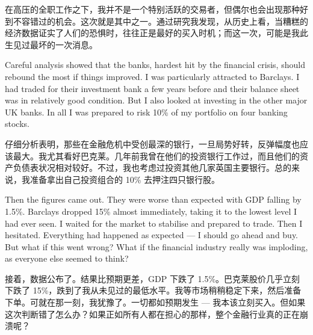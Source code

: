 \begin{chineseblock}在高压的全职工作之下，我并不是一个特别活跃的交易者，但偶尔也会出现那种好到不容错过的机会。这次就是其中之一。通过研究我发现，从历史上看，当糟糕的经济数据证实了人们的恐惧时，往往正是最好的买入时机；而这一次，可能是我此生见过最坏的一次消息。\end{chineseblock}

\bipairgap

\begin{englishblock} Careful analysis showed that the banks, hardest hit by the financial crisis, should rebound the most if things improved. I was particularly attracted to Barclays. I had traded for their investment bank a few years before and their balance sheet was in relatively good condition. But I also looked at investing in the other major UK banks. In all I was prepared to risk 10\% of my portfolio on four banking stocks. \end{englishblock}

\begin{chineseblock}仔细分析表明，那些在金融危机中受创最深的银行，一旦局势好转，反弹幅度也应该最大。我尤其看好巴克莱。几年前我曾在他们的投资银行工作过，而且他们的资产负债表状况相对较好。不过，我也考虑过投资其他几家英国主要银行。总的来说，我准备拿出自己投资组合的 10\% 去押注四只银行股。\end{chineseblock}

\bipairgap

\begin{englishblock} Then the figures came out. They were worse than expected with GDP falling by 1.5\%. Barclays dropped 15\% almost immediately, taking it to the lowest level I had ever seen. I waited for the market to stabilise and prepared to trade. Then I hesitated. Everything had happened as expected --- I should go ahead and buy. But what if this went wrong? What if the financial industry really was imploding, as everyone else seemed to think? \end{englishblock}

\begin{chineseblock}接着，数据公布了。结果比预期更差，GDP 下跌了 1.5\%。巴克莱股价几乎立刻下跌了 15\%，跌到了我从未见过的最低水平。我等市场稍稍稳定下来，然后准备下单。可就在那一刻，我犹豫了。一切都如预期发生 --- 我本该立刻买入。但如果这次判断错了怎么办？如果正如所有人都在担心的那样，整个金融行业真的正在崩溃呢？\end{chineseblock}

\bipairgap

